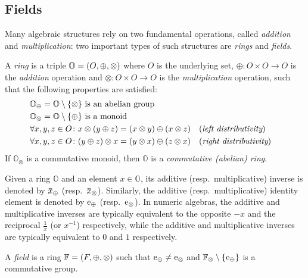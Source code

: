 \subsection{Fields}
Many algebraic structures rely on two fundamental operations, called \emph{addition} and 
\emph{multiplication}: two important types of such structures are \emph{rings} and \emph{fields}.
\begin{definition}[Ring]
  A \emph{ring} is a triple \(\mathbb{O} = \left(O, \oplus, \otimes\right)\) where \(O\) is the 
  underlying set, \(\oplus\colon O \times O \to O\) is the \emph{addition} operation and 
  \(\otimes\colon O \times O \to O\) is the \emph{multiplication} operation, such that the 
  following properties are satisfied:
  \begin{align*}
    & \mathbb{O}_{\oplus} = \mathbb{O} \setminus \Set{\otimes}
      \textnormal{ is an abelian group} \\
    & \mathbb{O}_{\otimes} = \mathbb{O} \setminus \Set{\oplus} 
      \textnormal{ is a monoid} \\
    & \forall x,y,z \in O\colon x \otimes \Parens*{y \oplus z} = 
      \Parens*{x \otimes y} \oplus \Parens*{x \otimes z} && (\emph{left distributivity})\\
    & \forall x,y,z \in O\colon \Parens*{y \oplus z} \otimes x = 
      \Parens*{y \otimes x} \oplus \Parens*{z \otimes x} && (\emph{right distributivity})
  \end{align*}
  If \(\mathbb{O}_{\otimes}\) is a commutative monoid, then \(\mathbb{O}\) is a 
  \emph{commutative (abelian) ring}.
\end{definition}

Given a ring \(\mathbb{O}\) and an element \(x \in \mathbb{O}\), its additive 
(resp.\ multiplicative) inverse is denoted by \(\inv{x}_{\oplus}\) (resp.\  \(\inv{x}_{\otimes}\)).
Similarly, the additive (resp.\ multiplicative) identity element is denoted by 
\(\mathrm{e}_{\oplus}\) (resp.\  \(\mathrm{e}_{\otimes}\)).
In numeric algebras, the additive and multiplicative inverses are typically equivalent to the 
opposite \(-x\) and the reciprocal \(\frac{1}{x}\) (or \(x^{-1}\)) respectively, while the additive 
and multiplicative inverses are typically equivalent to \(0\) and \(1\) respectively.

\begin{definition}[Field]
  A \emph{field} is a ring \(\mathbb{F} = \left(F, \oplus, \otimes\right)\) such that 
  \(\mathrm{e}_{\oplus} \neq \mathrm{e}_{\otimes}\) and \(\mathbb{F}_{\otimes} \setminus \left\{\mathrm{e}_{\oplus}\right\}\) 
  is a commutative group.
\end{definition}

